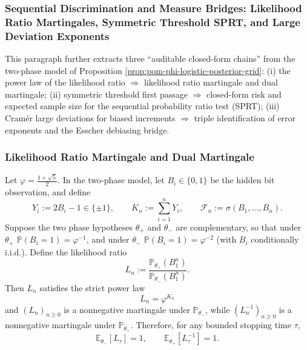 \subsubsection{Sequential Discrimination and Measure Bridges: Likelihood Ratio Martingales, Symmetric Threshold SPRT, and Large Deviation Exponents}\label{subsubsec:pom-golden-sequential-martingale-sprt-ldp}

This paragraph further extracts three ``auditable closed-form chains'' from the two-phase model of Proposition \ref{prop:pom-phi-logistic-posterior-grid}:
(i) the power law of the likelihood ratio \(\Rightarrow\) likelihood ratio martingale and dual martingale;
(ii) symmetric threshold first passage \(\Rightarrow\) closed-form risk and expected sample size for the sequential probability ratio test (SPRT);
(iii) Cram\'er large deviations for biased increments \(\Rightarrow\) triple identification of error exponents and the Esscher debiasing bridge.

\subsubsection{Likelihood Ratio Martingale and Dual Martingale}

\begin{proposition}\label{prop:pom-golden-likelihood-ratio-martingales}
Let \(\varphi=\frac{1+\sqrt5}{2}\).
In the two-phase model, let \(B_i\in\{0,1\}\) be the hidden bit observation, and define
\[
Y_i:=2B_i-1\in\{\pm 1\},\qquad
K_n:=\sum_{i=1}^{n}Y_i,\qquad
\mathcal{F}_n:=\sigma(B_1,\dots,B_n).
\]
Suppose the two phase hypotheses \(\theta_+\) and \(\theta_-\) are complementary, so that under \(\theta_+\)
\(\mathbb{P}(B_i=1)=\varphi^{-1}\), and under \(\theta_-\)
\(\mathbb{P}(B_i=1)=\varphi^{-2}\) (with \(B_i\) conditionally i.i.d.).
Define the likelihood ratio
\[
L_n:=\frac{\mathbb{P}_{\theta_+}(B_1^n)}{\mathbb{P}_{\theta_-}(B_1^n)}.
\]
Then \(L_n\) satisfies the strict power law
\[
\boxed{\;L_n=\varphi^{K_n}\;}
\]
and \((L_n)_{n\ge 0}\) is a nonnegative martingale under \(\mathbb{P}_{\theta_-}\), while \((L_n^{-1})_{n\ge 0}\) is a nonnegative martingale under \(\mathbb{P}_{\theta_+}\).
Therefore, for any bounded stopping time \(\tau\),
\[
\boxed{\;\mathbb{E}_{\theta_-}[L_\tau]=1,\qquad \mathbb{E}_{\theta_+}[L_\tau^{-1}]=1.\;}
\]
\end{proposition}

